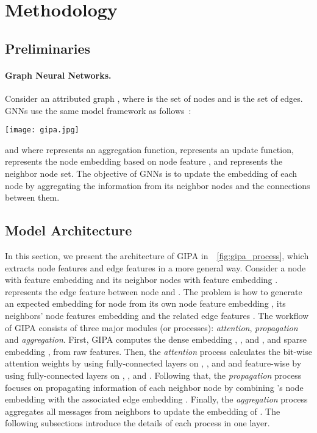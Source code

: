 \documentclass[runningheads]{llncs}
\newcommand{\model}{GIPA\xspace}
\begin{document}
\section{Methodology}
\subsection{Preliminaries}
\paragraph{Graph Neural Networks.} Consider an attributed graph , where  is the set of nodes and  is the set of edges. GNNs use the same model framework as follows~\cite{hamilton2017inductive,xu2018powerful}:


\begin{figure*}[t!]
    \centering
    \texttt{[image: gipa.jpg]}
    \caption{The architecture of \model, which consists of \textit{attention}, \textit{propagation}, and \textit{aggregation} modules (or processes). The red shadow indicates the bit-wise module and feature-wise module, which extract neighbor information more relevant to the current node through more fine-grained selective information fusion.}
    \label{fig:gipa_process}
\vspace{-0.1cm}
\end{figure*}


and \noindent where  represents an aggregation function,  represents an update function,  represents the node embedding based on node feature , and  represents the neighbor node set. The objective of GNNs is to update the embedding of each node by aggregating the information from its neighbor nodes and the connections between them. 

\subsection{Model Architecture}
In this section, we present the architecture of \model in~\figurename~\ref{fig:gipa_process}, which  extracts node features and edge features in a more general way. Consider a node  with feature embedding  and its neighbor nodes  with feature embedding .  represents the edge feature between node  and . The problem is how to generate an expected embedding for node  from its own node feature embedding , its neighbors' node features embedding  and the related edge features . 
The workflow of \model consists of three major modules (or processes): \textit{attention}, \textit{propagation} and \textit{aggregation}. 
First, \model computes the dense embedding , , and , and sparse embedding ,  from raw features.
Then, the \textit{attention} process calculates the bit-wise attention weights by using fully-connected layers on , , and  and feature-wise by using fully-connected layers on , , and . 
Following that, the \textit{propagation} process focuses on propagating information of each neighbor node  by combining 's node embedding  with the associated edge embedding . 
Finally, the \textit{aggregation} process aggregates all messages from neighbors to update the embedding of . The following subsections introduce the details of each process in one layer.
\end{document}

